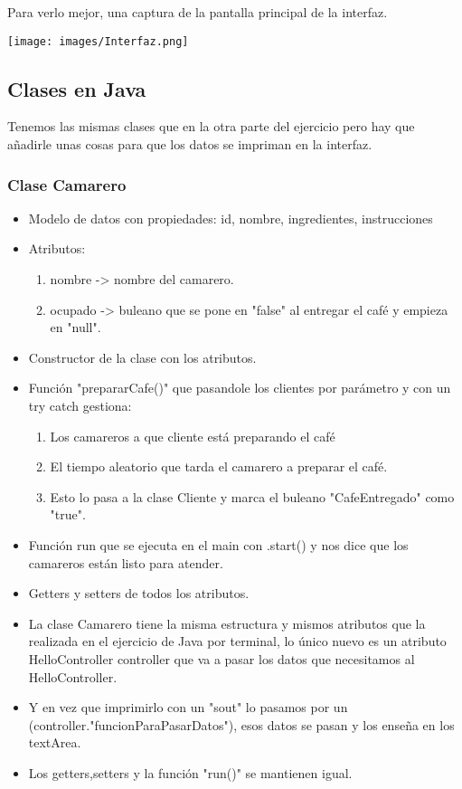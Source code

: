 \documentclass[a4paper,12pt]{article}
\begin{document}
Para verlo mejor, una captura de la pantalla principal de la interfaz.

\vspace{1cm}
\texttt{[image: images/Interfaz.png]}
\vspace{1cm}

\subsection{Clases en Java}
Tenemos las mismas clases que en la otra parte del ejercicio pero hay que añadirle unas cosas para que los datos se impriman en la interfaz.

\subsubsection{Clase Camarero}
\begin{itemize}
\item Modelo de datos con propiedades: id, nombre, ingredientes, instrucciones
\item Atributos:
    \begin{enumerate}
        \item nombre -> nombre del camarero.
        \item ocupado -> buleano que se pone en "false" al entregar el café y empieza en "null".
    \end{enumerate}
\item Constructor de la clase con los atributos.
\item Función "prepararCafe()" que pasandole los clientes por parámetro y con un try catch gestiona:
    \begin{enumerate}
        \item Los camareros a que cliente está preparando el café
        \item El tiempo aleatorio que tarda el camarero a preparar el café.
        \item Esto lo pasa a la clase Cliente y marca el buleano "CafeEntregado" como "true".
    \end{enumerate}
\item Función run que se ejecuta en el main con .start() y nos dice que los camareros están listo para atender.
\item Getters y setters de todos los atributos. 
\item La clase Camarero tiene la misma estructura y mismos atributos que la realizada en el ejercicio de Java por terminal, lo único nuevo es un atributo HelloController controller que va a pasar los datos que necesitamos al HelloController.
\item Y en vez que imprimirlo con un "sout" lo pasamos por un (controller."funcionParaPasarDatos"), esos datos se pasan y los enseña en los textArea.
\item Los getters,setters y la función "run()" se mantienen igual.
\end{itemize}
\end{document}
